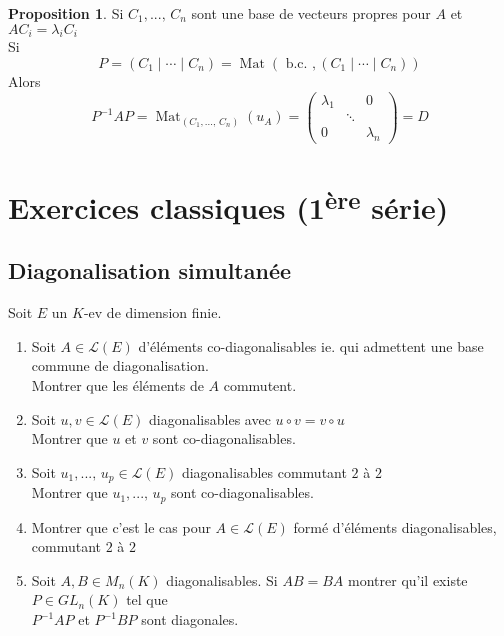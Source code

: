 \documentclass[10pt,a4paper]{article}
\theoremstyle{definition}
\newtheorem{proposition}{Proposition}[section]
\DeclareMathOperator*{\Mat}{Mat}
\begin{document}
\begin{proposition}
Si $C_1, ...,\, C_n$ sont une base de vecteurs propres pour $A$ et $A C_i = \lambda_i C_i$\\
Si 
\[ P = \left(C_1 \mid \cdots \mid C_n \right) = \Mat \left( \text{ b.c. },  (C_1 \mid \cdots \mid C_n) \right) \]
Alors
\[ P^{-1} A P = \Mat_{(C_1, ...,\, C_n)}(u_A) = \begin{pmatrix}
\lambda_1 & & 0 \\
& \ddots & \\
0 & & \lambda_n
\end{pmatrix} = D \]
\end{proposition}

\pagebreak

\section{Exercices classiques (1\textsuperscript{ère} série)}
\renewcommand{\labelenumi}{\arabic{enumi}}
\subsection{Diagonalisation simultanée}
\noindent Soit $E$ un $K$-ev de dimension finie.
\begin{enumerate}
\item Soit $A \in \mathcal{L}(E)$ d'éléments co-diagonalisables ie. qui admettent une base commune de diagonalisation. \\
Montrer que les éléments de $A$ commutent.
\item Soit $u, v \in \mathcal{L}(E)$ diagonalisables avec $u \circ v = v \circ u$ \\
Montrer que $u$ et $v$ sont co-diagonalisables.
\item Soit $u_1, ...,\, u_p \in \mathcal{L}(E)$ diagonalisables commutant $2$ à $2$ \\
Montrer que $u_1, ...,\, u_p$ sont co-diagonalisables.
\item Montrer que c'est le cas pour $A \in \mathcal{L}(E)$ formé d'éléments diagonalisables, commutant $2$ à $2$
\item Soit $A, B \in M_n(K)$ diagonalisables. Si $AB = BA$ montrer qu'il existe $P \in GL_n(K)$ tel que \\
$P^{-1}AP$ et $P^{-1}BP$ sont diagonales.
\end{enumerate}
\end{document}
